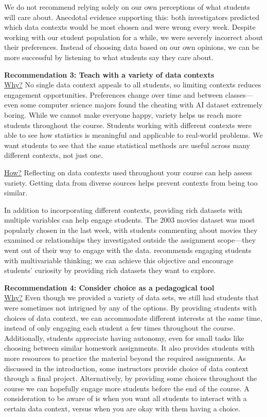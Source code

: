 \documentclass[
  12pt]{article}
\begin{document}
We do not recommend relying solely on our own perceptions of what
students will care about. Anecdotal evidence supporting this: both
investigators predicted which data contexts would be most chosen and
were wrong every week. Despite working with our student population for a
while, we were severely incorrect about their preferences. Instead of
choosing data based on our own opinions, we can be more successful by
listening to what students say they care about.

\textbf{Recommendation 3: Teach with a variety of data contexts}\\
\underline{Why?} No single data context appeals to all students, so
limiting contexts reduces engagement opportunities. Preferences change
over time and between classes---even some computer science majors found
the cheating with AI dataset extremely boring. While we cannot make
everyone happy, variety helps us reach more students throughout the
course. Students working with different contexts were able to see how
statistics is meaningful and applicable to real-world problems. We want
students to see that the same statistical methods are useful across many
different contexts, not just one.

\underline{How?} Reflecting on data contexts used throughout your course
can help assess variety. Getting data from diverse sources helps prevent
contexts from being too similar.

In addition to incorporating different contexts, providing rich datasets
with multiple variables can help engage students. The 2003 movies
dataset was most popularly chosen in the last week, with students
commenting about movies they examined or relationships they investigated
outside the assignment scope---they went out of their way to engage with
the data. \citet{gaise2016} recommends engaging students with
multivariable thinking; we can achieve this objective and encourage
students' curiosity by providing rich datasets they want to explore.

\textbf{Recommendation 4: Consider choice as a pedagogical tool}\\
\underline{Why?} Even though we provided a variety of data sets, we
still had students that were sometimes not intrigued by any of the
options. By providing students with choices of data context, we can
accommodate different interests at the same time, instead of only
engaging each student a few times throughout the course. Additionally,
students appreciate having autonomy, even for small tasks like choosing
between similar homework assignments. It also provides students with
more resources to practice the material beyond the required assignments.
As discussed in the introduction, some instructors provide choice of
data context through a final project. Alternatively, by providing some
choices throughout the course we can hopefully engage more students
before the end of the course. A consideration to be aware of is when you
want all students to interact with a certain data context, versus when
you are okay with them having a choice.
\end{document}
